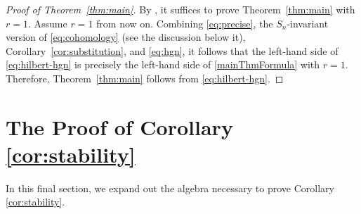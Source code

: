 \documentclass[11pt,reqno]{amsproc}
\numberwithin{equation}{section}
\theoremstyle{definition}
\theoremstyle{remark}
\begin{document}
\begin{proof}[Proof of Theorem~\ref{thm:main}]
    By \cite{huang2020cohomology}, it suffices to prove Theorem~\ref{thm:main} with $r=1$. Assume $r=1$ from now on. Combining \eqref{eq:precise}, the $S_n$-invariant version of \eqref{eq:cohomology} (see the discussion below it), Corollary~\ref{cor:substitution}, and \eqref{eq:hgn}, it follows that the left-hand side of \eqref{eq:hilbert-hgn} is precisely the left-hand side of \eqref{mainThmFormula} with $r=1$. Therefore, Theorem~\ref{thm:main} follows from \eqref{eq:hilbert-hgn}. 
\end{proof}

\section{The Proof of Corollary \ref{cor:stability}}\label{corProof}

In this final section, we expand out the algebra necessary to prove Corollary \ref{cor:stability}.
\end{document}
